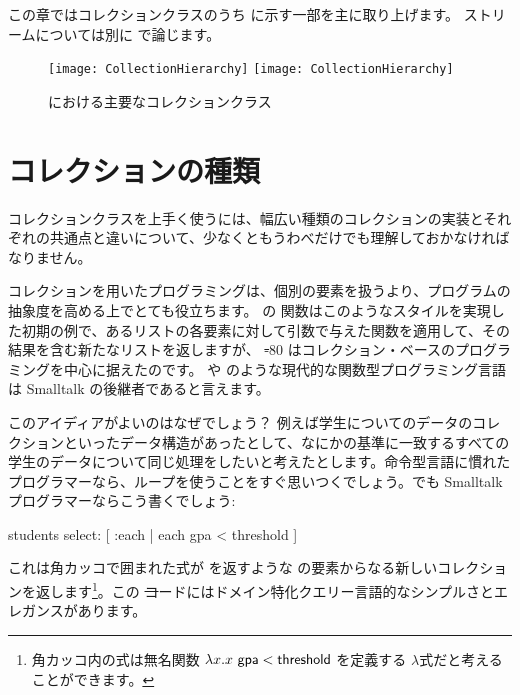 \documentclass[a4paper,10pt,twoside]{book}
\begin{document}

この章ではコレクションクラスのうち  に示す一部を主に取り上げます。
ストリームについては別に  で論じます。


\begin{figure}
\begin{center}
\ifluluelse
	{\texttt{[image: CollectionHierarchy]}}
	{\texttt{[image: CollectionHierarchy]}}
\caption{\pharo における主要なコレクションクラス}
\end{center}
\end{figure}

\section{コレクションの種類}

コレクションクラスを上手く使うには、幅広い種類のコレクションの実装とそれぞれの共通点と違いについて、少なくともうわべだけでも理解しておかなければなりません。

コレクションを用いたプログラミングは、個別の要素を扱うより、プログラムの抽象度を高める上でとても役立ちます。
  の  関数はこのようなスタイルを実現した初期の例で、あるリストの各要素に対して引数で与えた関数を適用して、その結果を含む新たなリストを返しますが、 \st-80 はコレクション・ベースのプログラミングを中心に据えたのです。 や  のような現代的な関数型プログラミング言語は Smalltalk の後継者であると言えます。

このアイディアがよいのはなぜでしょう？
例えば学生についてのデータのコレクションといったデータ構造があったとして、なにかの基準に一致するすべての学生のデータについて同じ処理をしたいと考えたとします。命令型言語に慣れたプログラマーなら、ループを使うことをすぐ思いつくでしょう。でも Smalltalk プログラマーならこう書くでしょう:
\begin{code}{}
students select: [ :each | each gpa < threshold ]
\end{code}
\noindent
これは角カッコで囲まれた式が  を返すような  の要素からなる新しいコレクションを返します\footnote{角カッコ内の式は無名関数 $\lambda x. x~{\sf gpa} < {\sf threshold}$ を定義する $\lambda$式だと考えることができます。}。この \st コードにはドメイン特化クエリー言語的なシンプルさとエレガンスがあります。
\end{document}
